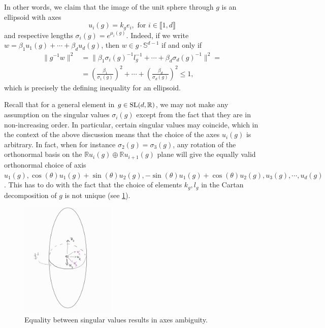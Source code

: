 \documentclass{report}
\begin{document}
In other words, we claim that the image of the unit sphere through $g$ is an ellipsoid with axes
\[
u_i(g) = k_g e_i, \text{ for } i \in \llbracket 1, d \rrbracket
\]
and respective lengths $\sigma_i(g) = e^{\mu_i(g)}$.
Indeed, if we write $w = \beta_1 u_1(g) + \cdots + \beta_d u_d(g)$, then $w \in g \cdot \mathbb S^{d-1}$ if and only if 
\begin{align*}
    \| g^{-1}w \|^2 &= \| \beta_1 \sigma_i(g)^{-1} l_g^{-1} + \cdots + \beta_d \sigma_d(g)^{-1}\|^2 =\\
    &= \left(\frac{\beta_1}{\sigma_1(g)}\right)^2 + \cdots + \left(\frac{\beta_d}{\sigma_d(g)} \right)^2 \leq 1,
\end{align*}
which is precisely the defining inequality for an ellipsoid.

Recall that for a general element in $g \in \operatorname{{\mathrm{SL}}}(d, \mathbb R)$, we may not make any assumption on the singular values $\sigma_i(g)$ except from the fact that they are in non-increasing order.
In particular, certain singular values may coincide, which in the context of the above discussion means that the choice of the axes $u_i(g)$ is arbitrary.
In fact, when for instance $\sigma_2(g) = \sigma_3(g)$, any rotation of the orthonormal basis on the $\mathbb R u_i(g) \oplus \mathbb R u_{i+1}(g)$ plane will give the equally valid orthonormal choice of axis $u_1(g), \cos(\theta) u_1(g) + \sin(\theta) u_2(g), -\sin(\theta) u_1(g) + \cos(\theta) u_2(g), u_3(g), \cdots, u_d(g)$.
This has to do with the fact that the choice of elements $k_g, l_g$ in the Cartan decomposition of $g$ is not unique (see \cref{fig:arbitrary_axis}).
\begin{figure}[h]
    \centering
    \includegraphics[width=0.4\textwidth]{arbitrary_axis.jpg}
    \caption{Equality between singular values results in axes ambiguity.}
    \label{fig:arbitrary_axis}
\end{figure}
\end{document}
